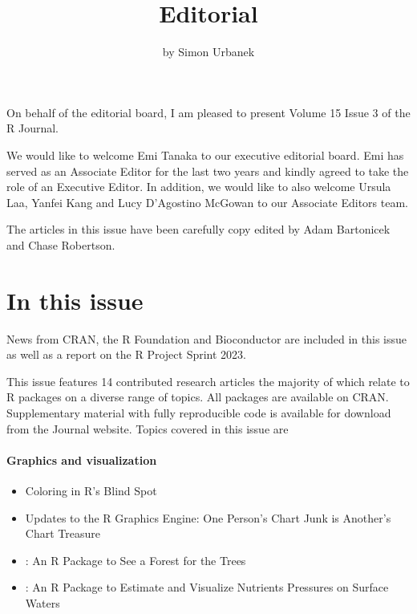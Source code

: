 \title{Editorial}


\author{by Simon Urbanek}

\maketitle


On behalf of the editorial board, I am pleased to present Volume 15 Issue 3 of the R Journal.

We would like to welcome Emi Tanaka to our executive editorial board. Emi has served as an Associate Editor for the last two years and kindly agreed to take the role of an Executive Editor. In addition, we would like to also welcome Ursula Laa, Yanfei Kang and Lucy D'Agostino McGowan to our Associate Editors team.

The articles in this issue have been carefully copy edited by Adam Bartonicek and Chase Robertson.

\hypertarget{in-this-issue}{%
\section*{In this issue}\label{in-this-issue}}

News from CRAN, the R Foundation and Bioconductor are included in this issue as well as a report on the R Project Sprint 2023.

\noindent This issue features 14 contributed research articles the majority of which relate to R packages
on a diverse range of topics. All packages are available on CRAN. Supplementary material with fully reproducible code is available for download from the Journal website. Topics covered in this issue are

\hypertarget{graphics-and-visualization}{%
\paragraph{Graphics and visualization}\label{graphics-and-visualization}}

\begin{itemize}
\tightlist
\item
  Coloring in R's Blind Spot
\item
  Updates to the R Graphics Engine: One Person's Chart Junk is Another's Chart Treasure
\item
  : An R Package to See a Forest for the Trees
\item
  : An R Package to Estimate and Visualize Nutrients Pressures on Surface Waters
\end{itemize}

